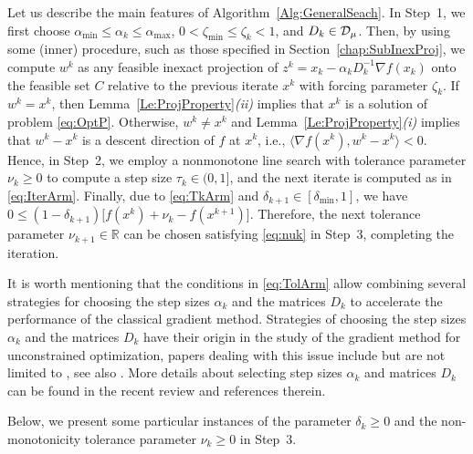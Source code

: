 Let us describe the main features of Algorithm~\ref{Alg:GeneralSeach}. In Step~1,  we first  choose   $\alpha_{\min}\leq \alpha_k \leq \alpha_{\max}$, $0 < \zeta_{\min} \leq \zeta_k  < 1$, and  $D_k\in  {\cal D}_{\mu}$. Then, by using some (inner) procedure, such as those specified in Section~\ref{chap:SubInexProj}, we compute $w^k$ as any feasible inexact projection of $z^k = x_k - \alpha_kD_k^{-1}\nabla f(x_k)$ onto the feasible set $C$ relative to the previous iterate $x^k$ with forcing parameter $\zeta_k$. If $w^k= x^k$, then Lemma~\ref{Le:ProjProperty}{\it (ii)} implies that $x^{k}$ is a solution of  problem \eqref{eq:OptP}.  Otherwise,  $w^k\neq  x^k$ and Lemma~\ref{Le:ProjProperty}{\it (i)}  implies  that $ w^k- x^k$ is a descent direction of $f$ at $x^k$, i.e.,  $\langle \nabla f(x^k), w^k- x^k \rangle < 0$.    Hence, in Step~2, we employ a nonmonotone line search  with tolerance parameter $\nu_k\geq 0$ to compute a step size  $\tau_k \in (0, 1]$,  and  the next iterate is computed as in \eqref{eq:IterArm}. Finally, due to  \eqref{eq:TkArm} and  $\delta_{k+1}\in [\delta_{\min}, 1]$, we have $0\leq (1-\delta_{k+1})\big[f(x^{k})+\nu_{k}-  f(x^{k+1})\big]$.  Therefore, the next   tolerance parameter $\nu_{k+1}\in {\mathbb R}$ can be chosen satisfying \eqref{eq:nuk}  in Step~3, completing the iteration.

 It is worth mentioning that the conditions in \eqref{eq:TolArm}  allow combining several strategies for choosing the step sizes $\alpha_k$  and the matrices $D_k$  to accelerate the performance of the classical gradient method.   Strategies  of choosing the step sizes $\alpha_k$  and the matrices $D_k$ have their origin in the study of the gradient  method  for unconstrained  optimization,  papers dealing with this issue include  but are not limited to \cite{BB1988, DaiHage2006, Serafino2018, Friedlander1999, Dai2006}, see also  \cite{BonettiniPrato2015, DaiFletcher2005, DaiFletcher2006, Polyak_Levitin1966}. More details  about   selecting  step sizes $\alpha_k$  and matrices $D_k$  can be found in the recent  review  \cite{bonettini2019recent} and  references therein.


Below, we present some  particular instances  of the parameter   $\delta_k\geq 0$ and  the non-monotonicity tolerance parameter $ \nu_ {k} \geq 0$  in Step~3.

